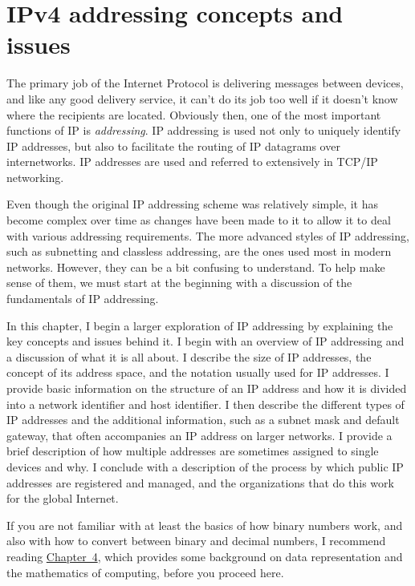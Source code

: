 \chapter{IPv4 addressing concepts and issues}
\label{chap:kozierok-ch16}

The primary job of the Internet Protocol is delivering messages between devices, and like any good delivery service, it can't do its job
too well if it doesn't know where the recipients are located.
Obviously then, one of the most important functions of IP is \emph{addressing}.
IP addressing is used not only to uniquely identify IP addresses, but also to facilitate the routing of IP datagrams over internetworks.
IP addresses are used and referred to extensively in TCP/IP networking.

Even though the original IP addressing scheme was relatively simple, it has become complex over time as changes have been made to it to allow it
to deal with various addressing requirements.
The more advanced styles of IP addressing, such as subnetting and classless addressing, are the ones used most in modern networks.
However, they can be a bit confusing to understand.
To help make sense of them, we must start at the beginning with a discussion of the fundamentals of IP addressing.

In this chapter, I begin a larger exploration of IP addressing
by explaining the key concepts and issues behind it. I begin with an
overview of IP addressing and a discussion of what it is all about. I
describe the size of IP addresses, the concept of its address space, and
the notation usually used for IP addresses. I provide basic information
on the structure of an IP address and how it is divided into a network
identifier and host identifier. I then describe the different types of
IP addresses and the additional information, such as a subnet mask and
default gateway, that often accompanies an IP address on larger
networks. I provide a brief description of how multiple addresses are
sometimes assigned to single devices and why. I conclude with a
description of the process by which public IP addresses are registered
and managed, and the organizations that do this work for the global
Internet.

\begin{backgroundinfo}
If you are not familiar with at least the basics of how binary numbers work, and also with how to
convert between binary and decimal numbers, I recommend reading \protect\hyperlink{ch04.html}{Chapter~4}, which provides some background
on data representation and the mathematics of computing, before you proceed here.
\end{backgroundinfo}




